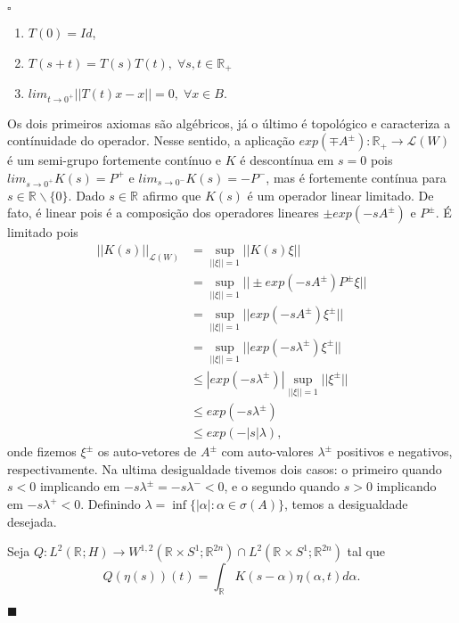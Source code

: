 \documentclass[12pt]{book}
\newenvironment{prova}[1]{$\square$ #1}{\hfill$\blacksquare$}
\newcommand{\circulo}{S^{1}}
\newcommand{\espacoLdois}[1]{L^{2}(#1)}
\newcommand{\espacosobolevgeral}[2]{W^{1,#1}(#2)}
\newcommand{\norma}[1]{||#1||}
\newcommand{\retacartesianocirculo}{\real{} \times \circulo}
\newcommand{\real}[1]{\mathbb{R}^{#1}}
\begin{document}
\begin{prova}
		\begin{enumerate}
			\item $T(0) = Id$,
			\item $T(s+t) = T(s)T(t), \;\forall s, t \in \real{}_{+}$
			\item $lim_{t \to 0^{+}}\norma{T(t)x - x } = 0, \; \forall x \in B $.
		\end{enumerate}
		Os dois primeiros  axiomas são algébricos, já o último é topológico e caracteriza a contínuidade do operador. Nesse sentido, a aplicação $exp(\mp A^{\pm}):\real{}_{+} \to \mathcal{L}(W)$ é um semi-grupo fortemente contínuo e $K$ é descontínua em $s=0$ pois $lim_{s\to 0^{+}}K(s) = P^{+}$ e $lim_{s\to 0^{-}} K(s)= -P^{-}$, mas é fortemente contínua para $s \in \real{}\backslash\{0\}$. Dado $s \in \real{}$ afirmo que $K(s)$ é um operador linear limitado. De fato, é linear pois é a composição dos operadores lineares $\pm exp(- sA^{\pm})$ e $P^{\pm}$. É limitado pois
		$$
		\begin{aligned}
		\norma{K(s)}_{\mathcal{L}(W)} &= \sup_{\norma{\xi}=1}\norma{K(s)\xi}
		\\
		&=\sup_{\norma{\xi}=1}\norma{\pm exp(- sA^{\pm})P^{\pm}\xi}
		\\
		&=\sup_{\norma{\xi}=1}\norma{exp(- sA^{\pm})\xi^{\pm}}
		\\
		&=\sup_{\norma{\xi}=1}\norma{exp(- s\lambda^{\pm})\xi^{\pm}}
		\\
		&\leq |exp(- s\lambda^{\pm})|\sup_{\norma{\xi}=1}\norma{\xi^{\pm}}
		\\
		&\leq exp(- s\lambda^{\pm})
		\\
		&\leq exp(- |s|\lambda),
		\end{aligned}
		$$
		onde fizemos $\xi^{\pm}$ os auto-vetores de $A^{\pm}$ com auto-valores $\lambda^{\pm}$ positivos e negativos, respectivamente. Na ultima desigualdade tivemos dois casos: o primeiro quando $s<0$ implicando em $- s\lambda^{\pm} = - s\lambda^{-} <0$, e o segundo quando $s>0$ implicando em $- s\lambda^{+}<0$. Definindo $\lambda = \inf \{|\alpha|: \alpha \in \sigma(A) \}$, temos a desigualdade desejada.
		
		Seja $Q: \espacoLdois{\real{};H} \to \espacosobolevgeral{2}{\retacartesianocirculo;\real{2n}} \cap \espacoLdois{\retacartesianocirculo;\real{2n}}$ tal que 
		$$
		Q(\eta(s))(t) = \int_{\real{}}K(s-\alpha)\eta(\alpha, t)d\alpha.
		$$
		

\end{prova}
\end{document}
